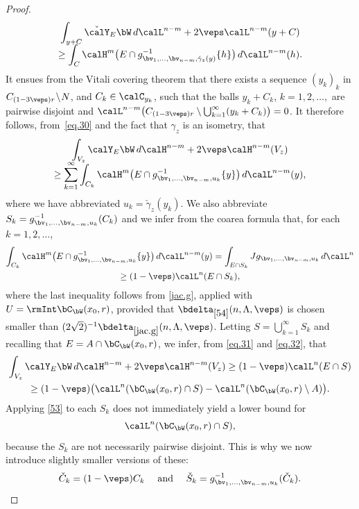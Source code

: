 \begin{proof}
\begin{multline}
\label{eq.30}
\int_{y + C} \check{\calY}_E \bW \,d\calL^{n-m} + 2\veps \calL^{n-m}(y+C)\\[-5pt]
\geq \int_C \calH^m \bigl(E \cap g_{\bv_1,\ldots,\bv_{n-m},\check{\gamma}_z(y)}^{-1}\{h\} \bigr) \,d\calL^{n-m}(h).
\end{multline}
It ensues from the Vitali covering theorem that there exists a sequence $(y_k)_k$ in \hbox{$C_{(1-3\veps)r}\!\setminus\!N$}, and $C_k \in \calC_{y_k}$, such that the balls $y_k + C_k$, $k=1,2,\ldots,$ are pairwise disjoint and $\calL^{n-m} \bigl(C_{(1-3\veps)r} \setminus \bigcup_{k=1}^\infty (y_k+C_k) \bigr) = 0$.
It therefore follows, from~\eqref{eq.30} and the fact that $\gamma_z$ is an isometry, that\vspace*{-5pt}
\begin{multline}
\label{eq.31}
\int_{V_z} \calY_E \bW \,d\calH^{n-m} +2\veps \calH^{n-m}(V_z)\\[-5pt]
\geq \sum_{k=1}^\infty \int_{C_k} \calH^m \bigl(E \cap g_{\bv_1,\ldots,\bv_{n-m},u_k}^{-1}\{y\} \bigr) \,d\calL^{n-m}(y),
\end{multline}
where we have abbreviated $u_k = \check{\gamma}_z(y_k)$.
We also abbreviate $S_k = g_{\bv_1,\ldots,\bv_{n-m},u_k}^{-1}(C_k)$ and we infer from the coarea formula that, for each $k=1,2,\ldots$,
\begin{multline}
\label{eq.32}
\int_{C_k} \calH^m \bigl(E \cap g_{\bv_1,\ldots,\bv_{n-m},u_k}^{-1}\{y\} \bigr) \,d\calL^{n-m}(y) = \int_{E \cap S_k} Jg_{\bv_1,\ldots,\bv_{n-m},u_k}\,d\calL^n \\
\geq (1-\veps) \calL^n(E \cap S_k),
\end{multline}
where the last inequality follows from \ref{jac.g}, applied with $U = \rmInt \bC_\bW(x_0,r)$, provided that $\bdelta_{\ref{54}}(n,\Lambda,\veps)$ is chosen smaller than $(2\sqrt{2})^{-1}\bdelta_{\ref{jac.g}}(n,\Lambda,\veps)$.
Letting $S = \bigcup_{k=1}^\infty S_k$ and recalling that $E = A \cap \bC_\bW(x_0,r)$, we infer, from \eqref{eq.31} and \eqref{eq.32}, that
\begin{multline}
\label{eq.33}
\int_{V_z} \calY_E \bW \,d\calH^{n-m} +2\veps \calH^{n-m}(V_z) \geq (1-\veps) \calL^n(E \cap S) \\
\geq (1-\veps) \big(\calL^n (\bC_\bW(x_0,r) \cap S) - \calL^n(\bC_\bW(x_0,r) \setminus A) \big).
\end{multline}
Applying \ref{53} to each $S_k$ does not immediately yield a lower bound for
\[
\calL^n (\bC_\bW(x_0,r) \cap S),
\]
because the $S_k$ are not necessarily pairwise disjoint.
This is why we now introduce slightly smaller versions of these:
\begin{equation*}
\check{C}_k = (1-\veps) C_k \quad \text{ and } \quad \check{S}_k = g_{\bv_1,\ldots,\bv_{n-m},u_k}^{-1}(\check{C}_k).
\end{equation*}


\end{proof}
